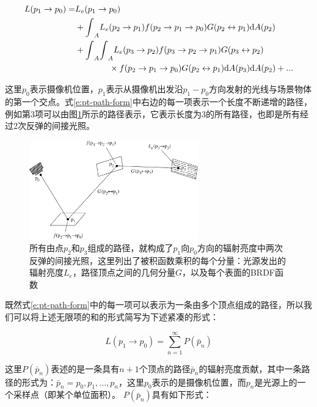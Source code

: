 \begin{equation}
	\begin{aligned}
		L(p_1\to p_0)=&L_e(p_1\to p_0)\\
		&+{\rm \int}_AL_e(p_2\to p_1)f(p_2\to p_1\to p_0)G(p_2\leftrightarrow p_1){\rm d}A(p_2)\\
		&+{\rm \int}_A{\rm \int}_A L_e(p_3\to p_2)f(p_3\to p_2\to p_1)G(p_3\leftrightarrow p_2)\\
		&\qquad\qquad \times f(p_2\to p_1\to p_0)G(p_2\leftrightarrow p_1){\rm d}A(p_3){\rm d}A(p_2)+...
	\end{aligned}
	\label{e:pt-path-form}
\end{equation}

这里$p_0$表示摄像机位置，$p_1$表示从摄像机出发沿$p_1-p_0$方向发射的光线与场景物体的第一个交点。式\ref{e:pt-path-form}中右边的每一项表示一个长度不断递增的路径，例如第3项可以由图\ref{f:pt-a-path}所示的路径表示，它表示长度为3的所有路径，也即是所有经过2次反弹的间接光照。

\begin{figure}
\sidecaption
	\includegraphics[width=0.65\textwidth]{figures/pt/path-5}
	\caption{所有由点$p_2$和$p_3$组成的路径，就构成了$p_1$向$p_0$方向的辐射亮度中两次反弹的间接光照，这里列出了被积函数乘积的每个分量：光源发出的辐射亮度$L_e$，路径顶点之间的几何分量$G$，以及每个表面的BRDF函数}
	\label{f:pt-a-path}
\end{figure}

既然式\ref{e:pt-path-form}中的每一项可以表示为一条由多个顶点组成的路径，所以我们可以将上述无限项的和的形式简写为下述紧凑的形式：

\begin{equation}\label{e:path-form}
	L(p_1\to p_0)=\sum_{n=1}^{\infty}P(\bar{p}_n)
\end{equation}

\noindent 这里$P(\bar{p}_n)$表述的是一条具有$n+1$个顶点的路径$\bar{p}_n$的辐射亮度贡献，其中一条路径的形式为：$\bar{p}_n=p_0,p_1,...,p_n$，这里$p_0$表示的是摄像机位置，而$p_n$是光源上的一个采样点（即某个单位面积）。 $P(\bar{p}_n)$具有如下形式：

